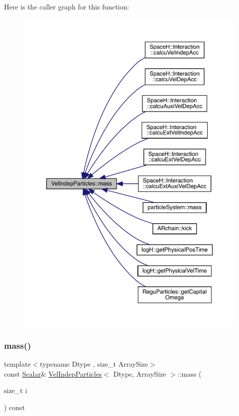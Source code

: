 Here is the caller graph for this function\+:\nopagebreak
\begin{figure}[H]
\begin{center}
\leavevmode
\includegraphics[width=350pt]{class_vel_indep_particles_ab2b7a9718d112bc2713448f9055a0833_icgraph}
\end{center}
\end{figure}
\mbox{\label{class_vel_indep_particles_a5c9b3e93851ab043136e09abcfbff926}} 
\subsubsection{\texorpdfstring{mass()}{mass()}\hspace{0.1cm}{\footnotesize\ttfamily [2/2]}}
{\footnotesize\ttfamily template$<$typename Dtype , size\+\_\+t Array\+Size$>$ \\
const \mbox{\hyperlink{class_vel_indep_particles_a5d275b22f0d759f360ddd80e78f4b466}{Scalar}}\& \mbox{\hyperlink{class_vel_indep_particles}{Vel\+Indep\+Particles}}$<$ Dtype, Array\+Size $>$\+::mass (\begin{DoxyParamCaption}\item[{size\+\_\+t}]{i }\end{DoxyParamCaption}) const\hspace{0.3cm}{\ttfamily [inline]}}



